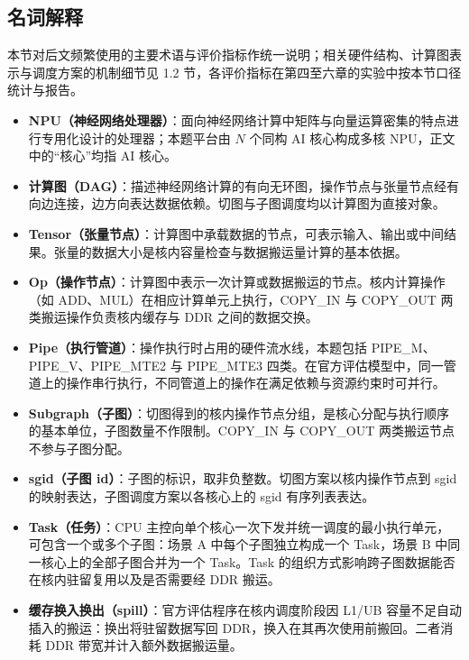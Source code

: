 \subsection{名词解释}
本节对后文频繁使用的主要术语与评价指标作统一说明；相关硬件结构、计算图表示与调度方案的机制细节见 1.2 节，各评价指标在第四至六章的实验中按本节口径统计与报告。

\begin{itemize}
\item \textbf{NPU（神经网络处理器）}：面向神经网络计算中矩阵与向量运算密集的特点进行专用化设计的处理器；本题平台由 $N$ 个同构 AI 核心构成多核 NPU，正文中的“核心”均指 AI 核心。
\item \textbf{计算图（DAG）}：描述神经网络计算的有向无环图，操作节点与张量节点经有向边连接，边方向表达数据依赖。切图与子图调度均以计算图为直接对象。
\item \textbf{Tensor（张量节点）}：计算图中承载数据的节点，可表示输入、输出或中间结果。张量的数据大小是核内容量检查与数据搬运量计算的基本依据。
\item \textbf{Op（操作节点）}：计算图中表示一次计算或数据搬运的节点。核内计算操作（如 ADD、MUL）在相应计算单元上执行，COPY\_IN 与 COPY\_OUT 两类搬运操作负责核内缓存与 DDR 之间的数据交换。
\item \textbf{Pipe（执行管道）}：操作执行时占用的硬件流水线，本题包括 PIPE\_M、PIPE\_V、PIPE\_MTE2 与 PIPE\_MTE3 四类。在官方评估模型中，同一管道上的操作串行执行，不同管道上的操作在满足依赖与资源约束时可并行。
\item \textbf{Subgraph（子图）}：切图得到的核内操作节点分组，是核心分配与执行顺序的基本单位，子图数量不作限制。COPY\_IN 与 COPY\_OUT 两类搬运节点不参与子图分配。
\item \textbf{sgid（子图 id）}：子图的标识，取非负整数。切图方案以核内操作节点到 sgid 的映射表达，子图调度方案以各核心上的 sgid 有序列表表达。
\item \textbf{Task（任务）}：CPU 主控向单个核心一次下发并统一调度的最小执行单元，可包含一个或多个子图：场景 A 中每个子图独立构成一个 Task，场景 B 中同一核心上的全部子图合并为一个 Task。Task 的组织方式影响跨子图数据能否在核内驻留复用以及是否需要经 DDR 搬运。
\item \textbf{缓存换入换出（spill）}：官方评估程序在核内调度阶段因 L1/UB 容量不足自动插入的搬运：换出将驻留数据写回 DDR，换入在其再次使用前搬回。二者消耗 DDR 带宽并计入额外数据搬运量。
\end{itemize}

